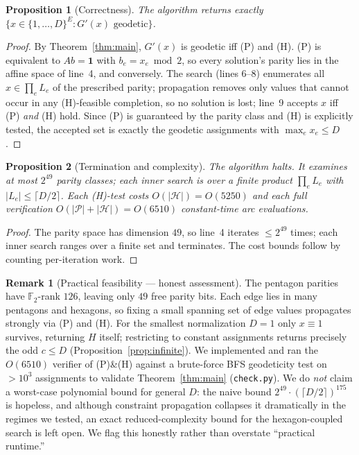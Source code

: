 \documentclass{amsart}
\newtheorem{proposition}{Proposition}
\theoremstyle{definition}
\newtheorem{remark}{Remark}
\begin{document}
\begin{proposition}[Correctness]
The algorithm returns exactly $\{x\in\{1,\dots,D\}^E:G'(x)\text{ geodetic}\}$.
\end{proposition}

\begin{proof}
By Theorem~\ref{thm:main}, $G'(x)$ is geodetic iff (P) and (H). (P) is
equivalent to $Ab=\mathbf 1$ with $b_e=x_e\bmod2$, so every solution's parity
lies in the affine space of line~4, and conversely. The search (lines 6--8)
enumerates all $x\in\prod_e L_e$ of the prescribed parity; propagation removes
only values that cannot occur in any (H)-feasible completion, so no solution is
lost; line~9 accepts $x$ iff (P) \emph{and} (H) hold. Since (P) is guaranteed by
the parity class and (H) is explicitly tested, the accepted set is exactly the
geodetic assignments with $\max_e x_e\le D$.
\end{proof}

\begin{proposition}[Termination and complexity]
The algorithm halts. It examines at most $2^{49}$ parity classes; each inner
search is over a finite product $\prod_e L_e$ with $|L_e|\le\lceil D/2\rceil$.
Each (H)-test costs $O(|\mathcal H|)=O(5250)$ and each full verification
$O(|\mathcal P|+|\mathcal H|)=O(6510)$ constant-time arc evaluations.
\end{proposition}

\begin{proof}
The parity space has dimension $49$, so line~4 iterates $\le 2^{49}$ times; each
inner search ranges over a finite set and terminates. The cost bounds follow by
counting per-iteration work.
\end{proof}

\begin{remark}[Practical feasibility --- honest assessment]\label{rem:feasible}
The pentagon parities have $\mathbb F_2$-rank $126$, leaving only $49$ free
parity bits. Each edge lies in many pentagons and hexagons, so fixing a small
spanning set of edge values propagates strongly via (P) and (H). For the smallest
normalization $D=1$ only $x\equiv1$ survives, returning $H$ itself; restricting
to constant assignments returns precisely the odd $c\le D$
(Proposition~\ref{prop:infinite}). We implemented and ran the
$O(6510)$ verifier of (P)\&(H) against a brute-force BFS geodeticity test on
$>10^3$ assignments to validate Theorem~\ref{thm:main}
(\texttt{check.py}). We do \emph{not} claim a worst-case polynomial bound for
general $D$: the naive bound $2^{49}\cdot(\lceil D/2\rceil)^{175}$ is hopeless,
and although constraint propagation collapses it dramatically in the regimes we
tested, an exact reduced-complexity bound for the hexagon-coupled search is left
open. We flag this honestly rather than overstate ``practical runtime.''
\end{remark}
\end{document}
